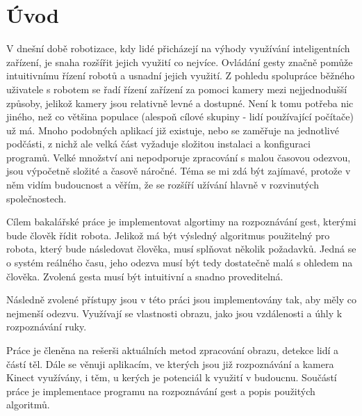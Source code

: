 \chapter{Úvod}
V dnešní době robotizace, kdy lidé přicházejí na výhody využívání inteligentních zařízení, je snaha rozšířit jejich využití co nejvíce. Ovládání gesty značně pomůže intuitivnímu řízení robotů a usnadní jejich využití. Z pohledu spolupráce běžného uživatele s robotem se řadí řízení zařízení za pomoci kamery mezi nejjednodušší způsoby, jelikož kamery jsou relativně levné a dostupné. Není k tomu potřeba nic jiného, než co většina populace (alespoň cílové skupiny - lidí používající počítače) už má. Mnoho podobných aplikací již existuje, nebo se zaměřuje na jednotlivé podčásti, z nichž ale velká část vyžaduje složitou instalaci a konfiguraci programů. Velké množství ani nepodporuje zpracování s malou časovou odezvou, jsou výpočetně složité a časově náročné. Téma se mi zdá být zajímavé, protože v něm vidím budoucnost a věřím, že se rozšíří užívání hlavně v rozvinutých společnostech.

Cílem bakalářské práce je implementovat algortimy na rozpoznávání gest, kterými bude člověk řídit robota. Jelikož má být výsledný algoritmus použitelný pro robota, který  bude  následovat člověka, musí splňovat několik požadavků. Jedná se o systém reálného času, jeho odezva musí být tedy dostatečně malá s ohledem na člověka. Zvolená gesta musí být intuitivní a snadno proveditelná. 		%

Následně zvolené přístupy jsou v této práci jsou implementovány tak, aby měly co nejmenší odezvu. Využívají se vlastnosti obrazu, jako jsou vzdálenosti a úhly k rozpoznávání ruky.

Práce je členěna na rešerši aktuálních metod zpracování obrazu, detekce lidí a částí těl. Dále se věnuji aplikacím, ve kterých jsou již rozpoznávání a kamera Kinect využívány, i těm, u kerých je potenciál k využití v budoucnu. Součástí práce je implementace programu na rozpoznávání gest a popis použitých algoritmů.
\endinput